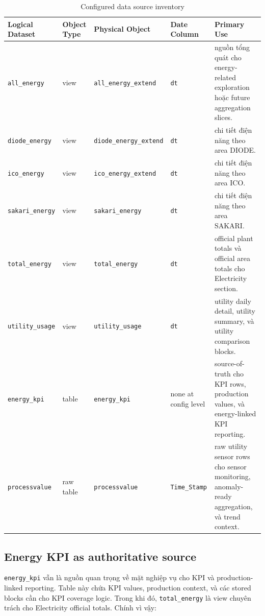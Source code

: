 \begin{table}[htbp]
	\centering
	\renewcommand{\arraystretch}{1.3}
	\caption{Configured data source inventory}
	\label{tab:data_source_inventory}
\begin{tabularx}{\linewidth}{|>{\RaggedRight\arraybackslash}p{2.6cm}|>{\RaggedRight\arraybackslash}p{2.1cm}|>{\RaggedRight\arraybackslash}p{2.9cm}|>{\RaggedRight\arraybackslash}p{1.7cm}|>{\RaggedRight\arraybackslash}X|}
		\hline
		\textbf{Logical Dataset} & \textbf{Object Type} & \textbf{Physical Object} & \textbf{Date Column} & \textbf{Primary Use} \\ \hline
		\texttt{all\_energy} & view & \texttt{all\_energy\_extend} & \texttt{dt} & nguồn tổng quát cho energy-related exploration hoặc future aggregation slices. \\ \hline
		\texttt{diode\_energy} & view & \texttt{diode\_energy\_extend} & \texttt{dt} & chi tiết điện năng theo area DIODE. \\ \hline
		\texttt{ico\_energy} & view & \texttt{ico\_energy\_extend} & \texttt{dt} & chi tiết điện năng theo area ICO. \\ \hline
		\texttt{sakari\_energy} & view & \texttt{sakari\_energy} & \texttt{dt} & chi tiết điện năng theo area SAKARI. \\ \hline
		\texttt{total\_energy} & view & \texttt{total\_energy} & \texttt{dt} & official plant totals và official area totals cho Electricity section. \\ \hline
		\texttt{utility\_usage} & view & \texttt{utility\_usage} & \texttt{dt} & utility daily detail, utility summary, và utility comparison blocks. \\ \hline
		\texttt{energy\_kpi} & table & \texttt{energy\_kpi} & none at config level & source-of-truth cho KPI rows, production values, và energy-linked KPI reporting. \\ \hline
		\texttt{processvalue} & raw table & \texttt{processvalue} & \texttt{Time\_Stamp} & raw utility sensor rows cho sensor monitoring, anomaly-ready aggregation, và trend context. \\ \hline
	\end{tabularx}
\end{table}

\subsection{Energy KPI as authoritative source}

\texttt{energy\_kpi} vẫn là nguồn quan trọng về mặt nghiệp vụ cho KPI và production-linked reporting. Table này chứa KPI values, production context, và các stored blocks cần cho KPI coverage logic. Trong khi đó, \texttt{total\_energy} là view chuyên trách cho Electricity official totals. Chính vì vậy:


